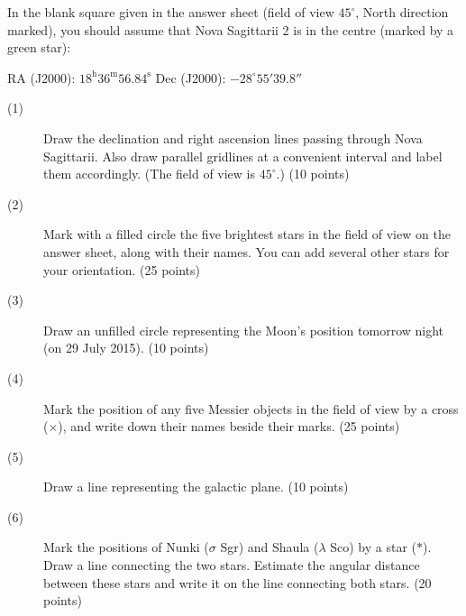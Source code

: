 In the blank square given in the answer sheet (field of view $45^\circ$,
North direction marked), you should assume that Nova Sagittarii 2 is in the
centre (marked by a green star):
\begin{center}
RA (J2000): $18^{\mathrm{h}} 36^{\mathrm{m}} 56.84^{\mathrm{s}}$ \qquad
Dec (J2000): $-28^\circ 55' 39.8''$
\end{center}

\begin{description}
\item[(1)] Draw the declination and right ascension lines passing through
  Nova Sagittarii. Also draw parallel gridlines at a convenient interval and
  label them accordingly. (The field of view is $45^\circ$.)
  \hfill(10 points)
\item[(2)] Mark with a filled circle the five brightest stars in the field
  of view on the answer sheet, along with their names. You can add several
  other stars for your orientation. \hfill(25 points)
\item[(3)] Draw an unfilled circle representing the Moon's position tomorrow
  night (on 29 July 2015). \hfill(10 points)
\item[(4)] Mark the position of any five Messier objects in the field of
  view by a cross ($\times$), and write down their names beside their marks.
  \hfill(25 points)
\item[(5)] Draw a line representing the galactic plane. \hfill(10 points)
\item[(6)] Mark the positions of Nunki ($\sigma$ Sgr) and Shaula
  ($\lambda$ Sco) by a star ($*$). Draw a line connecting the two stars.
  Estimate the angular distance between these stars and write it on the line
  connecting both stars. \hfill(20 points)
\end{description}


